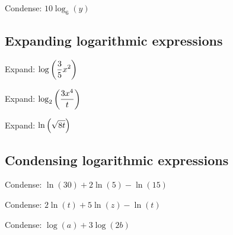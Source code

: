 \begin{exercise}
Condense: $10\log_6(y)$
\end{exercise}
\begin{solution}[1.5in]

\end{solution}

\subsection{Expanding logarithmic expressions}

\begin{exercise}
Expand: $\displaystyle\log\left(\frac{3}{5}x^2\right)$
\end{exercise}
\begin{solution}[4in]

\end{solution}

\begin{exercise}
Expand: $\displaystyle\log_2\left(\frac{3x^4}{t}\right)$
\end{exercise}
\begin{solution}[4in]

\end{solution}

\begin{exercise}
Expand: $\displaystyle\ln\left(\sqrt{8t}\right)$
\end{exercise}
\begin{solution}[4in]

\end{solution}

\subsection{Condensing logarithmic expressions}

\begin{exercise}
Condense: $\ln(30)+2\ln(5)-\ln(15)$
\end{exercise}
\begin{solution}[4in]

\end{solution}

\begin{exercise}
Condense: $2\ln(t)+5\ln(z)-\ln(t)$
\end{exercise}
\begin{solution}[4in]

\end{solution}

\begin{exercise}
Condense: $\log(a)+3\log(2b)$
\end{exercise}
\begin{solution}[4in]

\end{solution}

